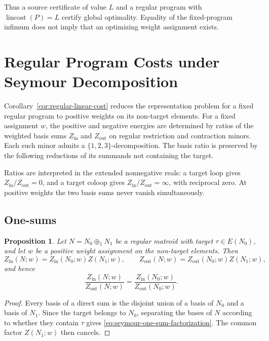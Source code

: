 \documentclass[11pt]{article}
\numberwithin{equation}{section}
\newtheorem{proposition}[definition]{Proposition}
\theoremstyle{remark}
\begin{document}
Thus a source certificate of value $L$ and a regular program with
$\operatorname{lincost}(P)=L$ certify global optimality. Equality of the
fixed-program infimum does not imply that an optimizing weight assignment
exists.

\section{Regular Program Costs under Seymour Decomposition}
\label{sec:seymour-calculus}

Corollary~\ref{cor:regular-linear-cost} reduces the representation problem for
a fixed regular program to positive weights on its non-target elements. For a
fixed assignment $w$, the positive and negative energies are determined by
ratios of the weighted basis sums $Z_{\mathrm{in}}$ and
$Z_{\mathrm{out}}$ on regular restriction and contraction minors. Each such
minor admits a $\{1,2,3\}$-decomposition. The basis ratio is preserved by the
following reductions of its summands not containing the target.

Ratios are interpreted in the extended nonnegative reals: a target loop
gives $Z_{\mathrm{in}}/Z_{\mathrm{out}}=0$, and a target coloop gives
$Z_{\mathrm{in}}/Z_{\mathrm{out}}=\infty$, with reciprocal zero. At positive
weights the two basis sums never vanish simultaneously.

\subsection{One-sums}
\label{subsec:seymour-one-sum}

\begin{proposition}
\label{prop:seymour-one-sum}
Let $N=N_0\oplus_1N_1$ be a regular matroid with target
$\tau\in E(N_0)$, and let $w$ be a positive weight assignment on the
non-target elements. Then
\begin{equation}
    Z_{\mathrm{in}}(N;w)
    =Z_{\mathrm{in}}(N_0;w)Z(N_1;w),
    \qquad
    Z_{\mathrm{out}}(N;w)
    =Z_{\mathrm{out}}(N_0;w)Z(N_1;w),
    \label{eq:seymour-one-sum-factorization}
\end{equation}
and hence
\begin{equation}
    \frac{Z_{\mathrm{in}}(N;w)}{Z_{\mathrm{out}}(N;w)}
    =
    \frac{Z_{\mathrm{in}}(N_0;w)}{Z_{\mathrm{out}}(N_0;w)}.
    \label{eq:seymour-one-sum-ratio}
\end{equation}
\end{proposition}

\begin{proof}
Every basis of a direct sum is the disjoint union of a basis of $N_0$ and a
basis of $N_1$. Since the target belongs to $N_0$, separating the bases of
$N$ according to whether they contain $\tau$ gives
\eqref{eq:seymour-one-sum-factorization}. The common factor $Z(N_1;w)$ then
cancels.
\end{proof}
\end{document}
